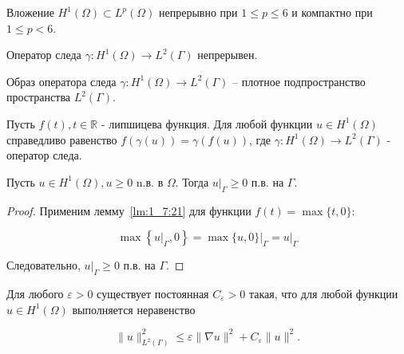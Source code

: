 \begin{lemma}
    \label{lm:1_7:embedding}\cite[1026]{Zeidler1990b}
    Вложение $H^{1}(\Omega) \subset L^{p}(\Omega)$ непрерывно
    при $1 \leq p \leq 6$ и компактно при $1 \leq p<6$.
\end{lemma}


\begin{lemma}
    \label{lm:1_7:19}\cite[239]{Zeidler1990a}
    Оператор следа $\gamma: H^{1}(\Omega) \rightarrow L^{2}(\Gamma)$ непрерывен.
\end{lemma}

\begin{lemma}
    \label{lm:1_7:20}\cite[4]{girault1979finite}
    Образ оператора следа $\gamma: H^{1}(\Omega) \rightarrow L^{2}(\Gamma)$
    -- плотное подпространство пространства $L^{2}(\Gamma)$.
\end{lemma}

\begin{lemma}
    \label{lm:1_7:21}\cite{berninger2009non}
    Пусть $f(t), t \in \mathbb{R}$ - липшицева функция.
    Для любой функции $u \in H^{1}(\Omega)$ справедливо равенство
    $f(\gamma(u))=\gamma(f(u))$, где
    $\gamma: H^{1}(\Omega) \rightarrow L^{2}(\Gamma)$ - оператор следа.
\end{lemma}

\begin{lemma}
    \label{lm:1_7:22}
    Пусть $u \in H^{1}(\Omega), u \geq 0$ n.в. в $\Omega$.
    Тогда $\left.u\right|_{\Gamma} \geq 0$ п.в. на $\Gamma$.
\end{lemma}

\begin{proof}
    Применим лемму~\ref{lm:1_7:21} для функции $f(t)=\max \{t, 0\}$:

    \[
        \max \left\{\left.u\right|_{\Gamma},
        0\right\}=\left.\max \{u, 0\}\right|_{\Gamma}=\left.u\right|_{\Gamma}
    \]


    Следовательно, $\left.u\right|_{\Gamma} \geq 0$ п.в. на $\Gamma$.
\end{proof}

\begin{lemma}
    \label{lm:1_7:23}\cite[41]{grisvard1985elliptic}
    Для любого $\varepsilon>0$ существует постоянная $C_{\varepsilon}>0$ такая,
    что для любой функции $u \in H^{1}(\Omega)$ выполняется неравенство

    \[
        \|u\|_{L^{2}(\Gamma)}^{2} \leq \varepsilon\|\nabla u\|^{2}
        +C_{\varepsilon}\|u\|^{2}.
    \]

\end{lemma}


